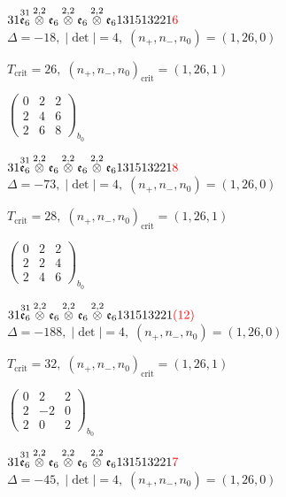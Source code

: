 \documentclass[10pt]{article}
\begin{document}
\smallskip

$31\overset{31}{\mathfrak{e}_6}\overset{2,2}{\otimes}\mathfrak{e}_6\overset{2,2}{\otimes}\mathfrak{e}_6\overset{2,2}{\otimes}\mathfrak{e}_6131513221\textcolor{red}{6}$ \quad $\Delta=-18,\; |\det|=4,\; (n_+,n_-,n_0)=(1,26,0)$

\hspace{1em}$T_{\text{crit}}=26,\; (n_+,n_-,n_0)_{\text{crit}}=(1,26,1)$

\hspace{2em}$\left(\begin{smallmatrix}0 & 2 & 2 \\ 2 & 4 & 6 \\ 2 & 6 & 8\end{smallmatrix}\right)_{\!b_0}$

$31\overset{31}{\mathfrak{e}_6}\overset{2,2}{\otimes}\mathfrak{e}_6\overset{2,2}{\otimes}\mathfrak{e}_6\overset{2,2}{\otimes}\mathfrak{e}_6131513221\textcolor{red}{8}$ \quad $\Delta=-73,\; |\det|=4,\; (n_+,n_-,n_0)=(1,26,0)$

\hspace{1em}$T_{\text{crit}}=28,\; (n_+,n_-,n_0)_{\text{crit}}=(1,26,1)$

\hspace{2em}$\left(\begin{smallmatrix}0 & 2 & 2 \\ 2 & 2 & 4 \\ 2 & 4 & 6\end{smallmatrix}\right)_{\!b_0}$

$31\overset{31}{\mathfrak{e}_6}\overset{2,2}{\otimes}\mathfrak{e}_6\overset{2,2}{\otimes}\mathfrak{e}_6\overset{2,2}{\otimes}\mathfrak{e}_6131513221\textcolor{red}{(12)}$ \quad $\Delta=-188,\; |\det|=4,\; (n_+,n_-,n_0)=(1,26,0)$

\hspace{1em}$T_{\text{crit}}=32,\; (n_+,n_-,n_0)_{\text{crit}}=(1,26,1)$

\hspace{2em}$\left(\begin{smallmatrix}0 & 2 & 2 \\ 2 & -2 & 0 \\ 2 & 0 & 2\end{smallmatrix}\right)_{\!b_0}$

$31\overset{31}{\mathfrak{e}_6}\overset{2,2}{\otimes}\mathfrak{e}_6\overset{2,2}{\otimes}\mathfrak{e}_6\overset{2,2}{\otimes}\mathfrak{e}_6131513221\textcolor{red}{7}$ \quad $\Delta=-45,\; |\det|=4,\; (n_+,n_-,n_0)=(1,26,0)$
\end{document}
